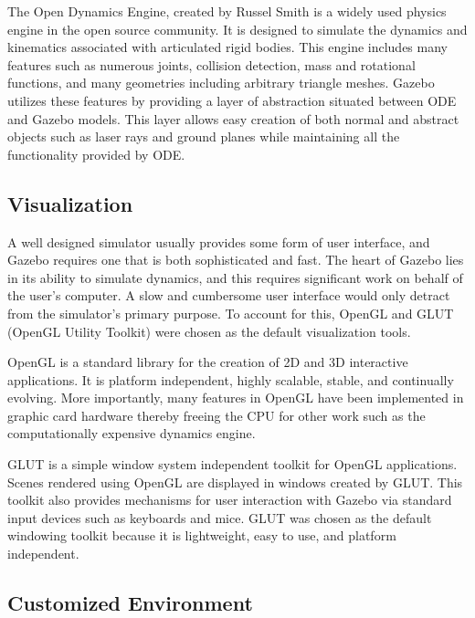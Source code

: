 The Open Dynamics Engine, created by Russel Smith is a widely used physics engine in the open source community. It is designed to simulate the dynamics and kinematics associated with articulated rigid bodies. This engine includes many features such as numerous joints, collision detection, mass and rotational functions, and many geometries including arbitrary triangle meshes. Gazebo utilizes these features by providing a layer of abstraction situated between ODE and Gazebo models. This layer allows easy creation of both normal and abstract objects such as laser rays and ground planes while maintaining all the functionality provided by ODE. %

\subsection{Visualization}

A well designed simulator usually provides some form of user interface, and Gazebo requires one that is both sophisticated and fast. The heart of Gazebo lies in its ability to simulate dynamics, and this requires significant work on behalf of the user's computer. A slow and cumbersome user interface would only detract from the simulator's primary purpose. To account for this, OpenGL and GLUT (OpenGL Utility Toolkit) were chosen as the default visualization tools.

OpenGL is a standard library for the creation of 2D and 3D interactive applications. It is platform independent, highly scalable, stable, and continually evolving. More importantly, many features in OpenGL have been implemented in graphic card hardware thereby freeing the CPU for other work such as the computationally expensive dynamics engine.

GLUT is a simple window system independent toolkit for OpenGL applications. Scenes rendered using OpenGL are displayed in windows created by GLUT. This toolkit also provides mechanisms for user interaction with Gazebo via standard input devices such as keyboards and mice. GLUT was chosen as the default windowing toolkit because it is lightweight, easy to use, and platform independent.

\subsection{Customized Environment}

